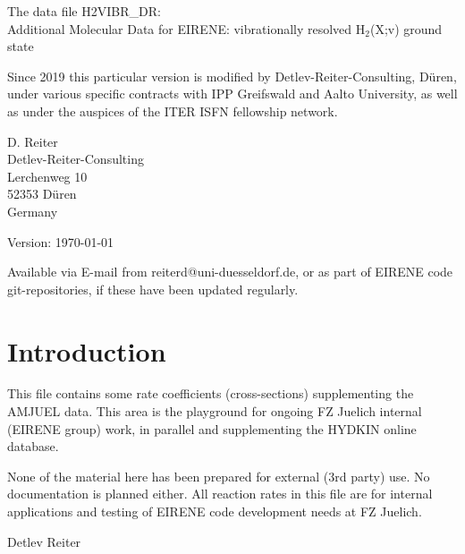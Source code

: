 \documentclass[12pt,dvipdfmx]{article}
\begin{document}
\parindent 0pt
{\LARGE \bf \center
\vspace*{3truecm}

The data file H2VIBR\_DR: \\
Additional  Molecular Data for EIRENE: vibrationally resolved H$_2$(X;v) ground state
}
{\Large \bf \center
\vspace*{1truecm}

Since 2019 this particular version is modified by Detlev-Reiter-Consulting, D\"uren,
under various specific contracts with IPP Greifswald and Aalto University,
as well as under the auspices of the ITER ISFN fellowship network.
\vspace*{3truecm}

D. Reiter \\
Detlev-Reiter-Consulting \\
Lerchenweg 10\\
52353 D\"uren \\
Germany
\vspace{3truecm}

Version: \today
\vspace{1truecm}

Available via E-mail from reiterd@uni-duesseldorf.de, or as part of
EIRENE code git-repositories, if these have been updated regularly.
}
\newpage
\renewcommand\thesection{\Roman{section}}
\newpage
{}
\tableofcontents
\newpage
\section{Introduction}\label{sec-intro}

This file contains some rate coefficients (cross-sections)
supplementing the AMJUEL data. This area is the playground for
ongoing FZ Juelich internal (EIRENE group) work, in parallel and
supplementing the HYDKIN online database.

None of the material here has been prepared for external (3rd party)
use. No documentation is planned either. All reaction rates in this
file are for internal applications and testing of EIRENE code
development needs at FZ Juelich.


Detlev Reiter
\end{document}
